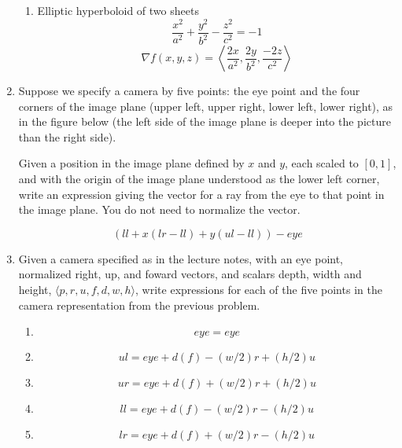 \documentclass{article}
\newcommand{\vect}[1]{\left\langle #1 \right\rangle}
\begin{document}
\begin{enumerate}
\begin{enumerate}
  \item Elliptic hyperboloid of two sheets
    \[ \frac{x^2}{a^2} + \frac{y^2}{b^2} - \frac{z^2}{c^2} = -1\]
    \[
    \nabla f(x,y,z) = \vect{\frac{2x}{a^2}, \frac{2y}{b^2}, \frac{-2z}{c^2}}
    \]

  \end{enumerate}

\item Suppose we specify a camera by five points: the eye point and the four corners of
  the image plane (upper left, upper right, lower left, lower right),
  as in the figure below (the left side of the image plane is deeper
  into the picture than the right side). 

    \tikzset{>=latex}

Given a position in the image plane defined by $x$ and $y$, each
scaled to $[0,1]$, and with the origin of the image plane understood
as the lower left corner, write an expression giving the vector for a
ray from the eye to that point in the image plane.  You do not need to
normalize the vector.

\[ (ll + x(lr-ll) + y(ul-ll)) - eye\]

\item Given a camera specified as in the lecture notes, with an eye
  point, normalized right, up, and foward vectors, and scalars depth,
  width and height, $\langle p, r, u, f, d, w, h\rangle$, write
  expressions for each of the five points in the camera representation
  from the previous problem.
  \begin{enumerate}
  \item \[eye = eye\]

    \item \[ul =  eye + d(f) - (w/2) r + (h/2) u\]

    \item \[ur = eye + d(f) + (w/2) r + (h/2) u\]

    \item \[ll = eye + d(f) - (w/2) r - (h/2) u\]

    \item \[lr = eye + d(f) + (w/2) r - (h/2) u\]

  \end{enumerate}
  
\end{enumerate}
\end{document}
